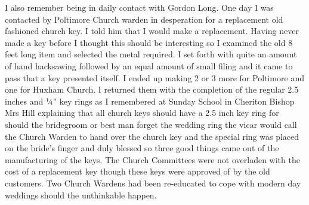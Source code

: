 I also remember being in daily contact with Gordon Long. One day I was contacted
by Poltimore Church warden in desperation for a replacement old fashioned
church key. I told him that I would make a replacement. Having never made a key
before I thought this should be interesting so I examined the old 8 feet long
item and selected the metal required. I set forth with quite an amount of hand
hacksawing followed by an equal amount of small filing and it came to pass that
a key presented itself. I ended up making 2 or 3 more for Poltimore and one for
Huxham Church. I returned them with the completion of the regular 2.5 inches
and ¼'' key rings as I remembered at Sunday School in Cheriton Bishop Mrs Hill
explaining that all church keys should have a 2.5 inch key ring for should the
bridegroom or best man forget the wedding ring the vicar would call the Church
Warden to hand over the church key and the special ring was placed on the
bride's finger and duly blessed so three good things came out of the
manufacturing of the keys. The Church Committees were not overladen with the
cost of a replacement key though these keys were approved of by the old
customers. Two Church Wardens had been re-educated to cope with modern day
weddings should the unthinkable happen.
